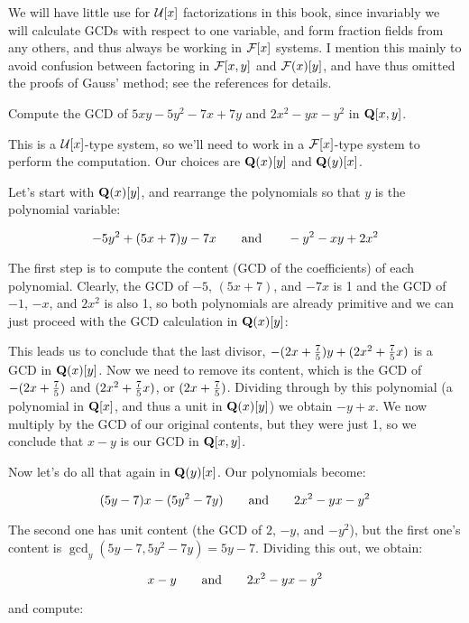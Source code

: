 We will have little use for ${\cal U}[x]$ factorizations in this book,
since invariably we will calculate GCDs with respect to one variable,
and form fraction fields from any others, and thus always be working
in ${\cal F}[x]$ systems.  I mention this mainly to avoid confusion
between factoring in ${\cal F}[x,y]$ and ${\cal F}(x)[y]$, and have
thus omitted the proofs of Gauss' method; see the references for
details.

\vfill\eject

\example

Compute the GCD of $5xy-5y^2-7x+7y$ and $2x^2-yx-y^2$ in ${\bf Q}[x,y]$.

This is a ${\cal U}[x]$-type system, so we'll need to work in a
${\cal F}[x]$-type system to perform the computation.  Our choices
are ${\bf Q}(x)[y]$ and ${\bf Q}(y)[x]$.

Let's start with ${\bf Q}(x)[y]$, and rearrange the polynomials
so that $y$ is the polynomial variable:

$$-5y^2+(5x+7)y-7x {\rm\qquad and\qquad} -y^2-xy+2x^2$$

The first step is to compute the content (GCD of the coefficients) of
each polynomial.  Clearly, the GCD of $-5$, $(5x+7)$, and $-7x$ is 1
and the GCD of $-1$, $-x$, and $2x^2$ is also 1, so both polynomials
are already primitive and we can just proceed with the GCD calculation
in ${\bf Q}(x)[y]$:



This leads us to conclude that the last divisor,
$-(2x+{7\over5})y+(2x^2+{7\over5}x)$ is a GCD in ${\bf Q}(x)[y]$.  Now
we need to remove its content, which is the GCD of $-(2x+{7\over5})$
and $(2x^2+{7\over5}x)$, or $(2x+{7\over5})$.  Dividing through by
this polynomial (a polynomial in ${\bf Q}[x]$, and thus a unit in
${\bf Q}(x)[y]$) we obtain $-y+x$.  We now multiply by the GCD of our
original contents, but they were just 1, so we conclude that $x-y$
is our GCD in ${\bf Q}[x,y]$.

Now let's do all that again in ${\bf Q}(y)[x]$.  Our polynomials become:

$$(5y-7)x-(5y^2-7y) {\rm\qquad and\qquad} 2x^2-yx-y^2$$

The second one has unit content (the GCD of $2$, $-y$, and $-y^2$),
but the first one's content is $\gcd_y(5y-7,5y^2-7y)=5y-7$.
Dividing this out, we obtain:

$$x-y {\rm\qquad and\qquad} 2x^2-yx-y^2$$

and compute:

